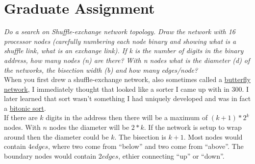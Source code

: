 \documentclass{article}
\begin{document}
\newpage
\section{Graduate Assignment}
\textit{Do a search on Shuffle-exchange network topology.  
Draw the network with 16 processor nodes (carefully numbering each node binary and showing what is a shuffle link, what is an exchange link).  If k is the number of digits in the binary address, how many nodes (n) are there?  With n nodes what is the diameter (d) of the networks, the bisection width (b) and how many edges/node?}\\

When you first drew a shuffle-exchange network, also sometimes called a \href{https://en.wikipedia.org/wiki/Butterfly_network}{butterfly network}, I immediately thought that looked like a sorter I came up with in 300. I later learned that sort wasn't something I had uniquely developed and was in fact a \href{https://en.wikipedia.org/wiki/Bitonic_sorter}{bitonic sort}.\\

If there are $k$ digits in the address then there will be a maximum of $(k + 1) * 2^k$ nodes. With $n$ nodes the diameter will be $2 * k$. If the network is setup to wrap around then the diameter could be $k$. The bisection is $k + 1$. Most nodes would contain $4 edges$, where two come from ``below'' and two come from ``above''. The boundary nodes would contain $2 edges$, ethier connecting ``up'' or ``down''.
\end{document}
